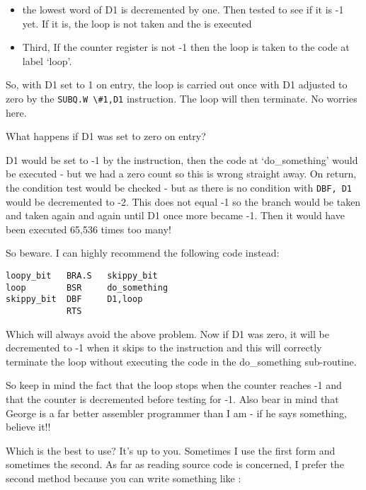 \begin{note}
\begin{itemize}[itemsep=0pt]
\item{}the lowest word of D1 is decremented by one. Then tested to
          see if it is -{}1 yet. If it is, the loop is not taken and the  is
          executed


\item{}Third, If the counter register is not -{}1 then the loop is
          taken to the code at label `loop'.

\end{itemize}

So, with D1 set to 1 on entry, the loop is carried out once with
      D1 adjusted to zero by the \lstinline{SUBQ.W \#1,D1} instruction. The loop will then terminate. No worries here. 

What happens if D1 was set to zero on entry?

D1 would be set to -{}1 by the  instruction, then the code at
      `do\_something' would be executed -{} but we had a zero count so this is
      wrong straight away. On return, the condition test would be checked -{}
      but as there is no condition with \lstinline{DBF, D1} would be decremented to -{}2.
      This does not equal -{}1 so the branch would be taken and taken again and
      again until D1 once more became -{}1. Then it would have been executed
      65,536 times too many!

So beware. I can highly recommend the following code instead:

\begin{lstlisting}[firstnumber=1,caption={Fixed Looping Example},label={lst:FixedLoopExample}]
loopy_bit   BRA.S   skippy_bit
loop        BSR     do_something
skippy_bit  DBF     D1,loop
            RTS
\end{lstlisting}

Which will always avoid the above problem. Now if D1 was zero, it
      will be decremented to -{}1 when it skips to the  instruction and this
      will correctly terminate the loop without executing the code in the
      do\_something sub-{}routine.

So keep in mind the fact that the loop stops when the counter
      reaches -{}1 and that the counter is decremented before testing for -{}1.
      Also bear in mind that George is a far better assembler programmer than I
      am -{} if he says something, believe it!!

\end{note}

Which is the best to use? It's up to you. Sometimes I use the first
    form and sometimes the second. As far as reading source code is
    concerned, I prefer the second method because you can write something like
   :

